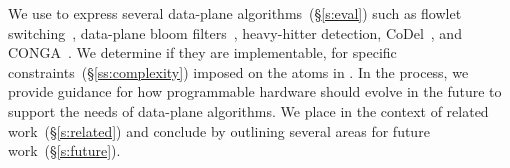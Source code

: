 We use \pktlanguage to express several data-plane algorithms~(\S\ref{s:eval})
such as flowlet switching~\cite{flowlets}, data-plane bloom
filters~\cite{bloom}, heavy-hitter detection, CoDel~\cite{codel}, and
CONGA~\cite{conga}. We determine if they are implementable, for specific
constraints~(\S\ref{ss:complexity}) imposed on the atoms in \absmachine. In the
process, we provide guidance for how programmable hardware should evolve in the
future to support the needs of data-plane algorithms.  We place \pktlanguage in
the context of related work~(\S\ref{s:related}) and conclude by outlining several
areas for future work~(\S\ref{s:future}).
